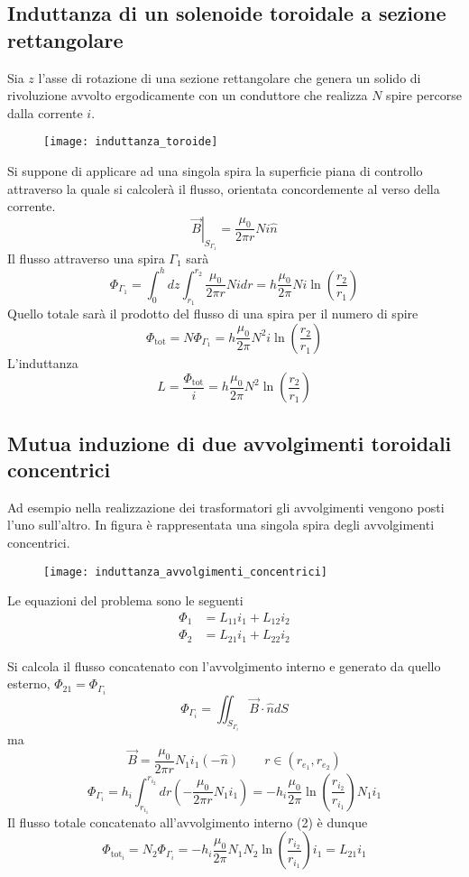 \subsection{Induttanza di un solenoide toroidale a sezione rettangolare}
Sia $z$ l'asse di rotazione di una sezione rettangolare che genera un solido di rivoluzione
avvolto ergodicamente con un conduttore che realizza $N$ spire percorse dalla corrente $i$.

\begin{figure}[H]
\centering
\texttt{[image: induttanza\_toroide]}
\end{figure}

Si suppone di applicare ad una singola spira la superficie piana di controllo attraverso la
quale si calcolerà il flusso, orientata concordemente al verso della corrente.
$$
\left.\vec{B}\right|_{S_{\Gamma_1}} = \frac{\mu_0}{2\pi r} Ni \hat{n}
$$
Il flusso attraverso una spira $\Gamma_1$ sarà
$$
\Phi_{\Gamma_1} = \int_0^h dz \int_{r_1}^{r_2} \frac{\mu_0}{2\pi r} N i dr = h \frac{\mu_0}{2\pi} Ni \ln\left(\frac{r_2}{r_1}\right)
$$
Quello totale sarà il prodotto del flusso di una spira per il numero di spire
$$
\Phi_{\text{tot}} = N\Phi_{\Gamma_1} = h \frac{\mu_0}{2\pi} N^2 i \ln\left(\frac{r_2}{r_1}\right)
$$
L'induttanza
$$
L = \frac{\Phi_{\text{tot}}}{i} = h \frac{\mu_0}{2\pi} N^2 \ln\left(\frac{r_2}{r_1}\right)
$$

\newpage
\subsection{Mutua induzione di due avvolgimenti toroidali concentrici}
Ad esempio nella realizzazione dei trasformatori gli avvolgimenti vengono posti l'uno 
sull'altro. In figura è rappresentata una singola spira degli avvolgimenti concentrici.
\begin{figure}[H]
\centering
\texttt{[image: induttanza\_avvolgimenti\_concentrici]}
\end{figure}
Le equazioni del problema sono le seguenti
\begin{align*}
\Phi_1 &= L_{11}i_1 + L_{12}i_2 \\
\Phi_2 &= L_{21}i_1 + L_{22}i_2
\end{align*}

Si calcola il flusso concatenato con l'avvolgimento interno e generato da quello 
esterno, $\Phi_{21} = \Phi_{\Gamma_i}$
$$
\Phi_{\Gamma_i} = \iint_{S_{\Gamma_i}} \vec{B}\cdot\hat{n}dS
$$
ma 
$$
\vec{B} = \frac{\mu_0}{2 \pi r} N_1 i_1 (-\hat{n}) \qquad r\in (r_{e_1},r_{e_2})
$$
$$
\Phi_{\Gamma_i} = h_i \int_{r_{i_1}}^{r_{i_2}}dr \left(-\frac{\mu_0}{2\pi r} N_1 i_1\right) =
-h_i \frac{\mu_0}{2 \pi} \ln\left(\frac{r_{i_2}}{r_{i_1}}\right) N_1 i_1
$$
Il flusso totale concatenato all'avvolgimento interno (2) è dunque
$$
\Phi_{\text{tot}_i} = N_2 \Phi_{\Gamma_i} = -h_i \frac{\mu_0}{2 \pi} N_1N_2 \ln\left(\frac{r_{i_2}}{r_{i_1}}\right) i_1 = L_{21} i_1
$$

